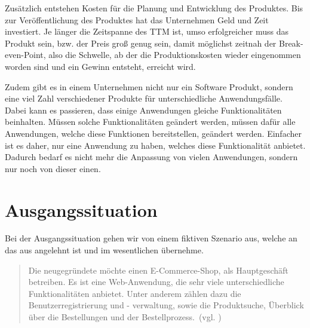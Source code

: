 Zusätzlich entstehen Kosten für die Planung und Entwicklung des Produktes. Bis zur Veröffentlichung des Produktes hat das Unternehmen Geld und Zeit investiert. Je länger die Zeitspanne des TTM ist, umso erfolgreicher muss das Produkt sein, bzw. der Preis groß genug sein, damit möglichst zeitnah der Break-even-Point, also die Schwelle, ab der die Produktionskosten wieder eingenommen worden sind und ein Gewinn entsteht, erreicht wird.

Zudem gibt es in einem Unternehmen nicht nur ein Software Produkt, sondern eine viel Zahl verschiedener Produkte für unterschiedliche Anwendungsfälle. Dabei kann es passieren, dass einige Anwendungen gleiche Funktionalitäten beinhalten. Müssen solche Funktionalitäten geändert werden, müssen dafür alle Anwendungen, welche diese Funktionen bereitstellen, geändert werden. Einfacher ist es daher, nur eine Anwendung zu haben, welches diese Funktionalität anbietet. Dadurch bedarf es nicht mehr die Anpassung von vielen Anwendungen, sondern nur noch von dieser einen.

\section{Ausgangssituation}
\label{sec:ausgangssituation}
Bei der Ausgangssituation gehen wir von einem fiktiven Szenario aus, welche an das aus \cite[S. 15]{EWolff2016:Microservices} angelehnt ist und im wesentlichen übernehme.

\begin{quotation}
    \frqq Die neugegründete \textit{\gmbh} möchte einen E-Commerce-Shop, als Hauptgeschäft betreiben. Es ist eine Web-Anwendung, die sehr viele unterschiedliche Funktionalitäten anbietet. Unter anderem zählen dazu die Benutzerregistrierung und - verwaltung, sowie die Produktsuche, Überblick über die Bestellungen und der Bestellprozess.\flqq\ (vgl. \cite[S. 15]{EWolff2016:Microservices})
\end{quotation}

